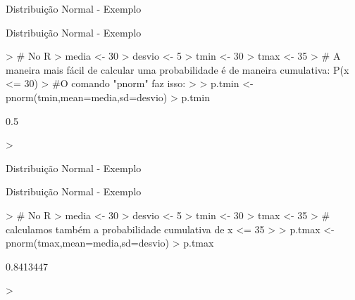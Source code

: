 \documentclass{beamer}
\begin{document}
\begin{frame}[fragile]{Distribuição Normal - Exemplo}



\end{frame} 


\begin{frame}[fragile]{Distribuição Normal - Exemplo}


\begin{Schunk}
\begin{Sinput}
> # No R
> media <- 30
> desvio <- 5
> tmin <- 30
> tmax <- 35
> # A maneira mais fácil de calcular uma probabilidade é de maneira cumulativa: P(x <= 30)
> #O comando "pnorm" faz isso:
> 
> p.tmin <- pnorm(tmin,mean=media,sd=desvio)
> p.tmin
\end{Sinput}
\begin{Soutput}
[1] 0.5
\end{Soutput}
\begin{Sinput}
> 
\end{Sinput}
\end{Schunk}

\end{frame} 


\begin{frame}[fragile]{Distribuição Normal - Exemplo}


\end{frame} 

\begin{frame}[fragile]{Distribuição Normal - Exemplo}


\begin{Schunk}
\begin{Sinput}
> # No R
> media <- 30
> desvio <- 5
> tmin <- 30
> tmax <- 35
> # calculamos também a probabilidade cumulativa de x <= 35
> 
> p.tmax <- pnorm(tmax,mean=media,sd=desvio)
> p.tmax
\end{Sinput}
\begin{Soutput}
[1] 0.8413447
\end{Soutput}
\begin{Sinput}
> 
\end{Sinput}
\end{Schunk}

\end{frame} 
\end{document}
